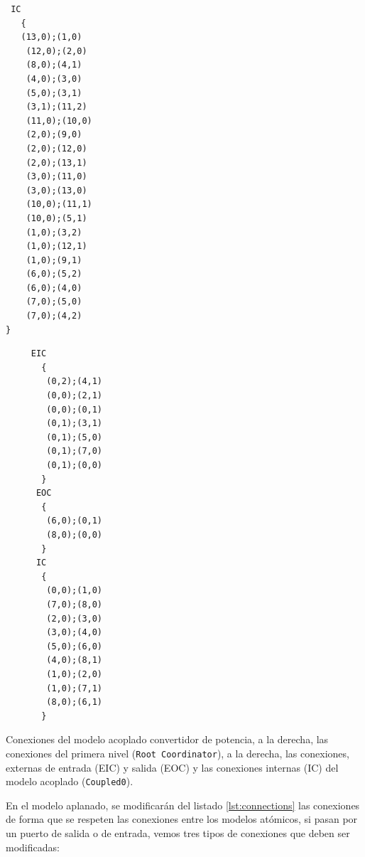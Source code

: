 \begin{listing}
\begin{minipage}[t]{0.5\linewidth}
\centering
\begin{verbatim}
 IC
   {
   (13,0);(1,0)
    (12,0);(2,0)
    (8,0);(4,1)
    (4,0);(3,0)
    (5,0);(3,1)
    (3,1);(11,2)
    (11,0);(10,0)
    (2,0);(9,0)
    (2,0);(12,0)
    (2,0);(13,1)
    (3,0);(11,0)
    (3,0);(13,0)
    (10,0);(11,1)
    (10,0);(5,1)
    (1,0);(3,2)
    (1,0);(12,1)
    (1,0);(9,1)
    (6,0);(5,2)
    (6,0);(4,0)
    (7,0);(5,0)
    (7,0);(4,2)
}
\end{verbatim}
\end{minipage}
\begin{minipage}[t]{0.5\linewidth}
\begin{verbatim}
     EIC
       {
        (0,2);(4,1)
        (0,0);(2,1)
        (0,0);(0,1)
        (0,1);(3,1)
        (0,1);(5,0)
        (0,1);(7,0)
        (0,1);(0,0)
       }
      EOC
       {
        (6,0);(0,1)
        (8,0);(0,0)
       }
      IC
       {
        (0,0);(1,0)
        (7,0);(8,0)
        (2,0);(3,0)
        (3,0);(4,0)
        (5,0);(6,0)
        (4,0);(8,1)
        (1,0);(2,0)
        (1,0);(7,1)
        (8,0);(6,1)
       }
\end{verbatim}
\end{minipage}
\label{lst:connections}
\caption{Conexiones del modelo acoplado convertidor de potencia, a la derecha, las conexiones del primera nivel (\texttt{Root Coordinator}), a la derecha, 
        las conexiones, externas de entrada (EIC) y salida (EOC) y las conexiones internas (IC) del modelo acoplado (\texttt{Coupled0}).}
\end{listing}

        En el modelo aplanado, se modificarán del listado \ref{lst:connections} las conexiones de forma que se respeten las conexiones entre los modelos atómicos, 
	si pasan por un puerto de salida o de entrada, vemos tres tipos de conexiones que deben ser modificadas:

